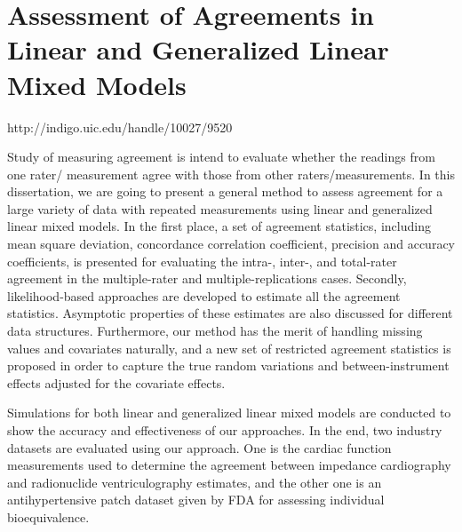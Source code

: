 \section{Assessment of Agreements in Linear and Generalized Linear Mixed Models}http://indigo.uic.edu/handle/10027/9520

Study of measuring agreement is intend to evaluate whether the readings from one rater/ measurement 
agree with those from other raters/measurements. 
In this dissertation, we are going to present a general method to assess agreement for a large 
variety of data with repeated measurements using linear and generalized linear mixed models. 
In the first place, a set of agreement statistics, including mean square deviation, concordance 
correlation coefficient, precision and accuracy coefficients, is presented for evaluating the 
intra-, inter-, and total-rater agreement in the multiple-rater and multiple-replications cases. 
Secondly, likelihood-based approaches are developed to estimate all the agreement statistics. 
Asymptotic properties of these estimates are also discussed for different data structures. 
Furthermore, our method has the merit of handling missing values and covariates naturally, 
and a new set of restricted agreement statistics is proposed in order to capture the true random 
variations and between-instrument effects adjusted for the covariate effects. 

Simulations for both linear and generalized linear mixed models are conducted to show the accuracy and effectiveness 
of our approaches. In the end, two industry datasets are evaluated using our approach. 
One is the cardiac function measurements used to determine the agreement between impedance cardiography and radionuclide 
ventriculography estimates, and the other one is an antihypertensive patch dataset given by FDA for assessing 
individual bioequivalence.
